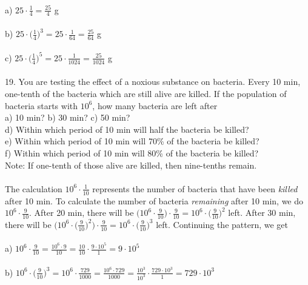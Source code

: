 \documentclass[12pt]{article}
\begin{document}
\\
a) $25\cdot \displaystyle \frac{1}{4}=\displaystyle \frac{25}{4}$ g \\
\\
b) $25\cdot \bigg(\displaystyle \frac{1}{4}\bigg)^3=25\cdot \displaystyle \frac{1}{64}=\displaystyle \frac{25}{64}$ g \\
\\
c) $25\cdot \bigg(\displaystyle \frac{1}{4}\bigg)^5=25\cdot \displaystyle \frac{1}{1024}=\displaystyle \frac{25}{1024}$ g \\
\\
19. You are testing the effect of a noxious substance on bacteria. Every 10 min, one-tenth of the bacteria which are still alive are killed. If the population of bacteria starts with $10^6$, how many bacteria are left after \\
a) 10 min? \hfill b) 30 min? \hfill c) 50 min? \\
d) Within which period of 10 min will half the bacteria be killed? \\
e) Within which period of 10 min will 70\% of the bacteria be killed? \\
f) Within which period of 10 min will 80\% of the bacteria be killed? \\
Note: If one-tenth of those alive are killed, then nine-tenths remain. \\
\\
The calculation $10^6\cdot \displaystyle \frac{1}{10}$ represents the number of bacteria that have been \textit{killed} after 10 min. To calculate the number of bacteria \textit{remaining} after 10 min, we do $10^6\cdot \displaystyle \frac{9}{10}$. After 20 min, there will be $\bigg(10^6\cdot \displaystyle \frac{9}{10}\bigg)\cdot \displaystyle \frac{9}{10}=10^6\cdot \bigg(\displaystyle \frac{9}{10}\bigg)^2$ left. After 30 min, there will be $\bigg(10^6\cdot \bigg(\displaystyle \frac{9}{10}\bigg)^2\bigg)\cdot \displaystyle \frac{9}{10}=10^6\cdot \bigg(\displaystyle \frac{9}{10}\bigg)^3$ left. Continuing the pattern, we get \\
\\
a) $10^6\cdot \displaystyle \frac{9}{10}=\displaystyle \frac{10^6\cdot9}{10}=\displaystyle \frac{10}{10}\cdot \displaystyle \frac{9\cdot10^5}{1}=9\cdot10^5$ \\
\\
b) $10^6\cdot \bigg(\displaystyle \frac{9}{10}\bigg)^3=10^6\cdot \displaystyle \frac{729}{1000}=\displaystyle \frac{10^6\cdot729}{1000}=\displaystyle \frac{10^3}{10^3}\cdot \displaystyle \frac{729\cdot10^3}{1}=729\cdot10^3$ \\
\end{document}
